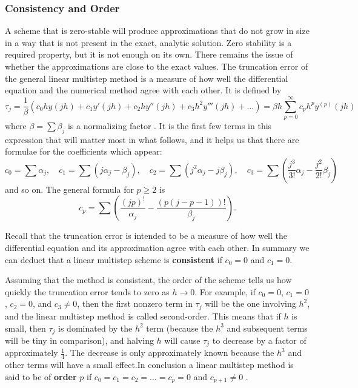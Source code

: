 \subsubsection*{Consistency and Order}
A scheme that is zero-stable will produce approximations that do not grow in size in a way that is not present in the exact, analytic solution. Zero stability is a required property, but it is not enough on its own. There remains the issue of whether the approximations are close to the exact values. The truncation error of the general linear multistep method is a measure of how well the differential equation and the numerical method agree with each other. It is defined by
\[
\tau_j = \frac{1}{\beta} \left( c_0 h y(jh) + c_1 y'(jh) + c_2 h y''(jh) + c_3 h^2 y'''(jh) + \ldots \right) = \beta h \sum_{p=0}^{\infty} c_p h^p y^{(p)}(jh)
\]
where $\beta = \sum \beta_j$ is a normalizing factor \cite{2022JFatokunEtAl}.
It is the first few terms in this expression that will matter most in what follows, and it helps us that there are formulae for the coefficients which appear:
\[
c_0 = \sum \alpha_j, \quad c_1 = \sum (j\alpha_j - \beta_j), \quad c_2 = \sum \left( j^2 \alpha_j - j \beta_j \right), \quad c_3 = \sum \left( \frac{j^3}{3!} \alpha_j - \frac{j^2}{2!} \beta_j \right)
\]
and so on. The general formula for $p \geq 2$ is
\[
c_p = \sum \left( \frac{(jp)^!}{\alpha_j} - \frac{(p(j-p-1))!}{\beta_j} \right).
\]

Recall that the truncation error is intended to be a measure of how well the differential equation and its approximation agree with each other\cite{HELM2008NumericalIVP}. In summary we can deduct that a linear multistep scheme is \textbf{consistent} if $c_0 = 0$ and $c_1 = 0$.


Assuming that the method is consistent, the order of the scheme tells us how quickly the truncation error tends to zero as $h \rightarrow 0$. For example, if $c_0 = 0$, $c_1 = 0$, $c_2 = 0$, and $c_3 \neq 0$, then the first nonzero term in $\tau_j$ will be the one involving $h^2$, and the linear multistep method is called second-order. This means that if $h$ is small, then $\tau_j$ is dominated by the $h^2$ term (because the $h^3$ and subsequent terms will be tiny in comparison), and halving $h$ will cause $\tau_j$ to decrease by a factor of approximately $\frac{1}{4}$. The decrease is only approximately known because the $h^3$ and other terms will have a small effect.In conclusion a linear multistep method is said to be of \textbf{order} $p$ if $c_0 = c_1 = c_2 = \ldots = c_p = 0$ and $c_{p+1} \neq 0$ \cite{HELM2008NumericalIVP}.

